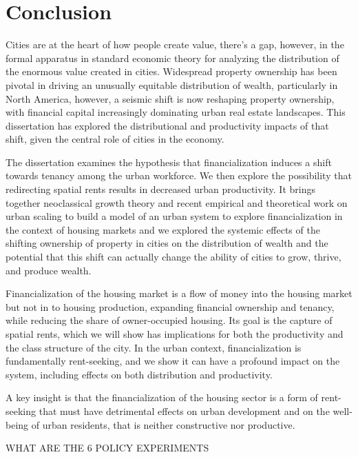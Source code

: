 \chapter{Conclusion} \label{chapter-conclusions}



Cities are at the heart of how people create value, there's a gap, however, in the formal apparatus in standard economic theory for analyzing the distribution of the enormous value created in cities. Widespread property ownership  has been pivotal in driving an unusually equitable distribution of wealth, particularly in North America, however, a seismic shift is now reshaping property ownership, with financial capital increasingly dominating urban real estate landscapes. This dissertation has explored the distributional and productivity impacts of that shift, given the central role of cities in the economy.


The dissertation examines the hypothesis that financialization induces a shift towards tenancy among the urban workforce. We then explore the possibility that redirecting spatial rents results in decreased urban productivity. 
It brings together \gls{neoclassical growth theory} and recent empirical and theoretical work on \gls{urban scaling} to build a model of an urban system to explore financialization in the context of housing markets and we explored the systemic effects of the shifting ownership of property in cities on the distribution of wealth and the potential that this shift can actually change the ability of cities to grow, thrive, and produce wealth.


Financialization of the housing market is a flow of money into the housing market but not in to housing production, expanding financial ownership and tenancy, while reducing the share of owner-occupied housing. Its goal is the capture of spatial rents, which we will show has implications for both the productivity and the class structure of the city. 
In the urban context, financialization is fundamentally \gls{rent-seeking}, and we show it can have a profound impact on the system, including effects on both distribution and productivity. 

A key insight is that the financialization of the housing sector is a form of \gls{rent-seeking} that must have detrimental effects on urban development and on the well-being of urban residents, that is neither constructive nor productive.

WHAT ARE THE 6 POLICY EXPERIMENTS

